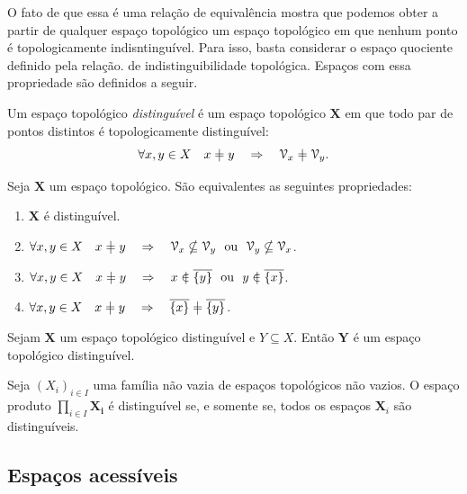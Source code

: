 O fato de que essa é uma relação de equivalência mostra que podemos obter a partir de qualquer espaço topológico um espaço topológico em que nenhum ponto é topologicamente indisntinguível. Para isso, basta considerar o espaço quociente definido pela relação. de indistinguibilidade topológica. Espaços com essa propriedade são definidos a seguir.

\begin{definition}[$T_0$]
Um espaço topológico \emph{distinguível} é um espaço topológico $\bm X$ em que todo par de pontos distintos é topologicamente distinguível:
	\begin{equation*}
	\forall x,y \in X \quad x \neq y \quad \Rightarrow \quad \viz_x \neq \viz_y.
	\end{equation*}
\end{definition}

\begin{proposition}
Seja $\bm X$ um espaço topológico. São equivalentes as seguintes propriedades:
	\begin{enumerate}
	\item $\bm X$ é distinguível.
	\item $\forall x,y \in X \quad x \neq y \quad \Rightarrow \quad \viz_x \nsubseteq \viz_y \ou \viz_y \nsubseteq \viz_x$.
	\item $\forall x,y \in X \quad x \neq y \quad \Rightarrow \quad x \notin \Fec{\{y\}} \ou y \notin \Fec{\{x\}}$.
	\item $\forall x,y \in X \quad x \neq y \quad \Rightarrow \quad \Fec{\{x\}} \neq \Fec{\{y\}}$.	
\end{enumerate}
\end{proposition}

\begin{proposition}
Sejam $\bm X$ um espaço topológico distinguível e $Y \subseteq X$. Então $\bm Y$ é um espaço topológico distinguível.
\end{proposition}

\begin{proposition}
Seja $(X_i)_{i \in I}$ uma família não vazia de espaços topológicos não vazios. O espaço produto $\prod_{i \in I} \bm{X_i}$ é distinguível se, e somente se, todos os espaços $\bm X_i$ são distinguíveis.
\end{proposition}

\subsection{Espaços acessíveis}

